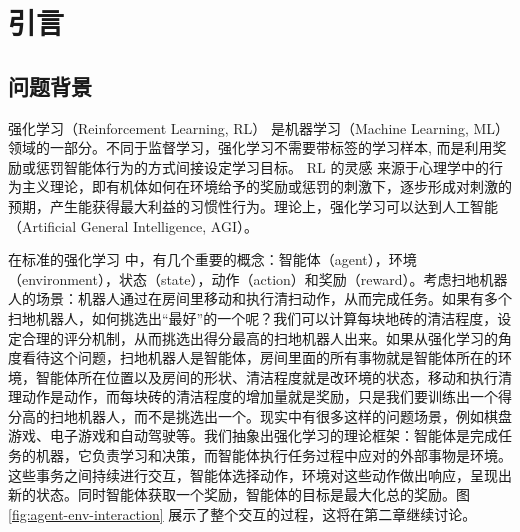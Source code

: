 
\chapter{引言}
\label{cha:introduction}

\section{问题背景}
\label{sec:background}

强化学习（Reinforcement Learning, RL）\cite{ReinforcementLearning2021} \cite{suttonReinforcementLearningIntroduction2018} 是机器学习（Machine Learning,  ML）领域的一部分。不同于监督学习，强化学习不需要带标签的学习样本, 而是利用奖励或惩罚智能体行为的方式间接设定学习目标。 RL 的灵感 \cite{ReinforcementLearning2021} 来源于心理学中的行为主义理论，即有机体如何在环境给予的奖励或惩罚的刺激下，逐步形成对刺激的预期，产生能获得最大利益的习惯性行为。理论上，强化学习可以达到人工智能（Artificial General Intelligence, AGI）\cite{salvadorREINFORCEMENTLEARNINGLITERATURE2020}。

在标准的强化学习 \cite{mnihAsynchronousMethodsDeep2016} 中，有几个重要的概念：智能体（agent），环境（environment），状态（state），动作（action）和奖励（reward）。考虑扫地机器人的场景：机器人通过在房间里移动和执行清扫动作，从而完成任务。如果有多个扫地机器人，如何挑选出“最好”的一个呢？我们可以计算每块地砖的清洁程度，设定合理的评分机制，从而挑选出得分最高的扫地机器人出来。如果从强化学习的角度看待这个问题，扫地机器人是智能体，房间里面的所有事物就是智能体所在的环境，智能体所在位置以及房间的形状、清洁程度就是改环境的状态，移动和执行清理动作是动作，而每块砖的清洁程度的增加量就是奖励，只是我们要训练出一个得分高的扫地机器人，而不是挑选出一个。现实中有很多这样的问题场景，例如棋盘游戏、电子游戏和自动驾驶等。我们抽象出强化学习的理论框架\cite{suttonReinforcementLearningIntroduction2018}：智能体是完成任务的机器，它负责学习和决策，而智能体执行任务过程中应对的外部事物是环境。这些事务之间持续进行交互，智能体选择动作，环境对这些动作做出响应，呈现出新的状态。同时智能体获取一个奖励，智能体的目标是最大化总的奖励。图 \ref{fig:agent-env-interaction} 展示了整个交互的过程，这将在第二章继续讨论。


